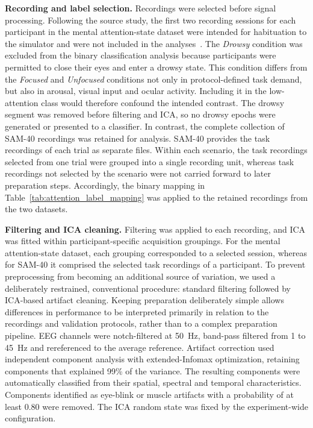 \documentclass[10pt,letterpaper]{article}
\newcommand{\rev}[1]{#1}
\begin{document}
\rev{\textbf{Recording and label selection.} Recordings were selected
before signal processing. Following the source study, the first two recording
sessions for each participant in the mental attention-state dataset were
intended for habituation to the simulator and were not included in the
analyses~\cite{aci2019attention}. The \textit{Drowsy} condition was excluded
from the binary classification analysis because participants were
permitted to close their eyes and enter a drowsy state. This condition differs
from the \textit{Focused} and \textit{Unfocused} conditions not only in
protocol-defined task demand, but also in arousal, visual input and ocular
activity. Including it in the low-attention class would therefore confound the
intended contrast. The drowsy segment was removed before filtering and ICA, so
no drowsy epochs were generated or presented to a classifier. In contrast, the complete collection of SAM-40 recordings was
retained for analysis. SAM-40 provides the task recordings of each trial as
separate files. Within each scenario, the task recordings selected from one
trial were grouped into a single recording unit, whereas task recordings not
selected by the scenario were not carried forward to later preparation steps.
Accordingly, the binary mapping in Table~\ref{tab:attention_label_mapping} was applied to the
retained recordings from the two datasets.}

\rev{\textbf{Filtering and ICA cleaning.} Filtering was applied to each
recording, and ICA was fitted within participant-specific acquisition
groupings. For the mental attention-state dataset, each grouping corresponded
to a selected session, whereas for SAM-40 it comprised the selected task recordings
of a participant. To prevent preprocessing from becoming an additional source
of variation, we used a deliberately restrained, conventional procedure:
standard filtering followed by ICA-based artifact cleaning. Keeping
preparation deliberately simple allows differences in performance to be
interpreted primarily in relation to the recordings and validation protocols,
rather than to a complex preparation pipeline. EEG channels were notch-filtered
at 50~Hz, band-pass filtered from 1 to 45~Hz and rereferenced to the average
reference. Artifact correction used independent component analysis with
extended-Infomax optimization, retaining components that explained 99\% of the
variance. The resulting components were automatically classified from their
spatial, spectral and temporal characteristics. Components identified as
eye-blink or muscle artifacts with a probability of at least 0.80 were removed.
The ICA random state was fixed by the experiment-wide configuration.}
\end{document}
